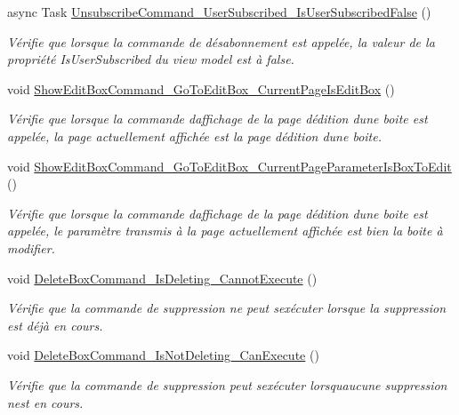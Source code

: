 \begin{DoxyCompactItemize}
async Task \hyperlink{class_boxes_1_1_tests_1_1_box_view_model_tests_ac02012cebfd38a0e20ccf51e47139efa}{Unsubscribe\+Command\+\_\+\+User\+Subscribed\+\_\+\+Is\+User\+Subscribed\+False} ()
\begin{DoxyCompactList}\small\item\em Vérifie que lorsque la commande de désabonnement est appelée, la valeur de la propriété {\ttfamily Is\+User\+Subscribed} du view model est à false. \end{DoxyCompactList}\item 
void \hyperlink{class_boxes_1_1_tests_1_1_box_view_model_tests_aa359ecc689414c8a78edac5188f935e5}{Show\+Edit\+Box\+Command\+\_\+\+Go\+To\+Edit\+Box\+\_\+\+Current\+Page\+Is\+Edit\+Box} ()
\begin{DoxyCompactList}\small\item\em Vérifie que lorsque la commande d\textquotesingle{}affichage de la page d\textquotesingle{}édition d\textquotesingle{}une boite est appelée, la page actuellement affichée est la page d\textquotesingle{}édition d\textquotesingle{}une boite. \end{DoxyCompactList}\item 
void \hyperlink{class_boxes_1_1_tests_1_1_box_view_model_tests_a5f6645029f13067e1875471a7395bc51}{Show\+Edit\+Box\+Command\+\_\+\+Go\+To\+Edit\+Box\+\_\+\+Current\+Page\+Parameter\+Is\+Box\+To\+Edit} ()
\begin{DoxyCompactList}\small\item\em Vérifie que lorsque la commande d\textquotesingle{}affichage de la page d\textquotesingle{}édition d\textquotesingle{}une boite est appelée, le paramètre transmis à la page actuellement affichée est bien la boite à modifier. \end{DoxyCompactList}\item 
void \hyperlink{class_boxes_1_1_tests_1_1_box_view_model_tests_a23a9d2873344050b8f4036dc6a1650d0}{Delete\+Box\+Command\+\_\+\+Is\+Deleting\+\_\+\+Cannot\+Execute} ()
\begin{DoxyCompactList}\small\item\em Vérifie que la commande de suppression ne peut s\textquotesingle{}exécuter lorsque la suppression est déjà en cours. \end{DoxyCompactList}\item 
void \hyperlink{class_boxes_1_1_tests_1_1_box_view_model_tests_aec861138c7c2e4c11de116228d90cf0a}{Delete\+Box\+Command\+\_\+\+Is\+Not\+Deleting\+\_\+\+Can\+Execute} ()
\begin{DoxyCompactList}\small\item\em Vérifie que la commande de suppression peut s\textquotesingle{}exécuter lorsqu\textquotesingle{}aucune suppression n\textquotesingle{}est en cours. \end{DoxyCompactList}\item 

\end{DoxyCompactItemize}

